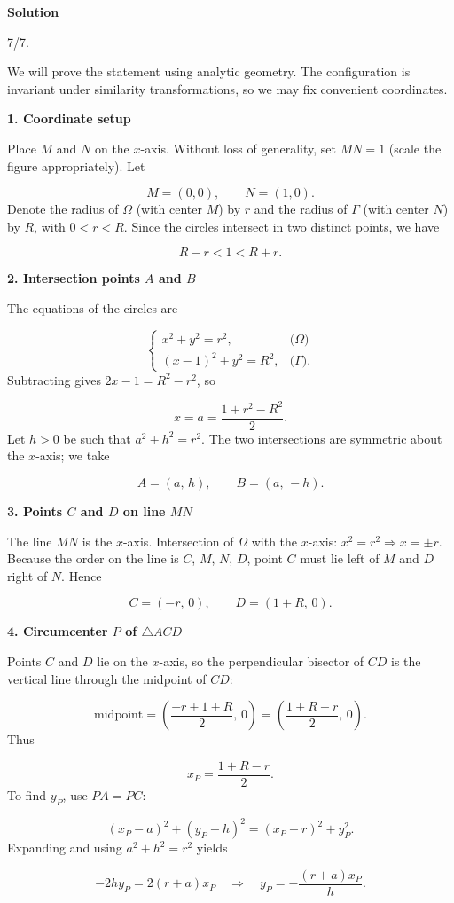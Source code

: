 \documentclass{llmxive}
\providecommand{\solutionheading}[1]{\par\smallskip\noindent\textbf{#1}\par}
\begin{document}
\solutionheading{Solution}
\begin{remark*}
  7/7.
\end{remark*}
We will prove the statement using analytic geometry. The configuration is invariant under similarity transformations, so we may fix convenient coordinates.\par
\solutionheading{1. Coordinate setup}
Place \(M\) and \(N\) on the \(x\)-axis. Without loss of generality, set \(MN = 1\) (scale the figure appropriately). Let\par
\[
M = (0,0),\qquad N = (1,0).
\]
Denote the radius of \(\Omega\) (with center \(M\)) by \(r\) and the radius of \(\Gamma\) (with center \(N\)) by \(R\), with \(0 < r < R\). Since the circles intersect in two distinct points, we have\par
\[
R - r < 1 < R + r.
\]
\solutionheading{2. Intersection points \(A\) and \(B\)}
The equations of the circles are\par
\[
\begin{cases}
x^2 + y^2 = r^2, & \text{(\(\Omega\))}\\[2mm]
(x-1)^2 + y^2 = R^2, & \text{(\(\Gamma\))}.
\end{cases}
\]
Subtracting gives \(2x-1 = R^2 - r^2\), so\par
\[
x = a = \frac{1 + r^2 - R^2}{2}.
\]
Let \(h > 0\) be such that \(a^2 + h^2 = r^2\). The two intersections are symmetric about the \(x\)-axis; we take\par
\[
A = (a,\, h),\qquad B = (a,\, -h).
\]
\solutionheading{3. Points \(C\) and \(D\) on line \(MN\)}
The line \(MN\) is the \(x\)-axis. Intersection of \(\Omega\) with the \(x\)-axis: \(x^2 = r^2 \Rightarrow x = \pm r\). Because the order on the line is \(C\), \(M\), \(N\), \(D\), point \(C\) must lie left of \(M\) and \(D\) right of \(N\). Hence\par
\[
C = (-r,\, 0),\qquad D = (1+R,\, 0).
\]
\solutionheading{4. Circumcenter \(P\) of \(\triangle ACD\)}
Points \(C\) and \(D\) lie on the \(x\)-axis, so the perpendicular bisector of \(CD\) is the vertical line through the midpoint of \(CD\):\par
\[
\text{midpoint} = \left(\frac{-r + 1+R}{2},\,0\right) = \left(\frac{1+R-r}{2},\,0\right).
\]
Thus\par
\[
x_P = \frac{1+R-r}{2}.
\]
To find \(y_P\), use \(PA = PC\):\par
\[
(x_P - a)^2 + (y_P - h)^2 = (x_P + r)^2 + y_P^2.
\]
Expanding and using \(a^2+h^2 = r^2\) yields\par
\[
-2h y_P = 2(r+a)x_P \quad\Longrightarrow\quad y_P = -\frac{(r+a)x_P}{h}.
\]
\end{document}
